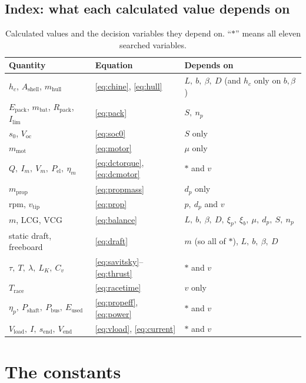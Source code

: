\documentclass[11pt,a4paper]{article}
\renewcommand{\_}{\textunderscore\allowbreak}
\newcommand{\Trace}{T_{\mathrm{race}}}
\newcommand{\Pshaft}{P_{\mathrm{shaft}}}
\newcommand{\Pbus}{P_{\mathrm{bus}}}
\newcommand{\Eused}{E_{\mathrm{used}}}
\newcommand{\Epack}{E_{\mathrm{pack}}}
\newcommand{\Voc}{V_{\mathrm{oc}}}
\newcommand{\Vload}{V_{\mathrm{load}}}
\newcommand{\Vend}{V_{\mathrm{end}}}
\newcommand{\Rpack}{R_{\mathrm{pack}}}
\newcommand{\lcg}{\mathrm{LCG}}
\newcommand{\vcg}{\mathrm{VCG}}
\begin{document}
\subsection{Index: what each calculated value depends on}
\begin{table}[H]
\centering\small
\caption{Calculated values and the decision variables they depend on. ``$\ast$'' means all eleven searched variables.}
\label{tab:index}
\begin{tabularx}{\textwidth}{@{}l l X@{}}
\toprule
Quantity & Equation & Depends on \\
\midrule
$h_c$, $A_{\mathrm{shell}}$, $m_{\mathrm{hull}}$ & \eqref{eq:chine}, \eqref{eq:hull} & $L,\ b,\ \beta,\ D$ (and $h_c$ only on $b,\beta$) \\
$\Epack$, $m_{\mathrm{bat}}$, $\Rpack$, $I_{\lim}$ & \eqref{eq:pack} & $S,\ n_p$ \\
$s_0$, $\Voc$ & \eqref{eq:soc0} & $S$ only \\
$m_{\mathrm{mot}}$ & \eqref{eq:motor} & $\mu$ only \\
$Q,\ I_m,\ V_m,\ P_{\mathrm{el}},\ \eta_m$ & \eqref{eq:dctorque}, \eqref{eq:dcmotor} & $\ast$ and $v$ \\
$m_{\mathrm{prop}}$ & \eqref{eq:propmass} & $d_p$ only \\
rpm, $v_{\mathrm{tip}}$ & \eqref{eq:prop} & $p,\ d_p$ and $v$ \\
$m$, $\lcg$, $\vcg$ & \eqref{eq:balance} & $L,\ b,\ \beta,\ D,\ \xi_p,\ \xi_b,\ \mu,\ d_p,\ S,\ n_p$ \\
static draft, freeboard & \eqref{eq:draft} & $m$ (so all of $\ast$), $L,\ b,\ \beta,\ D$ \\
$\tau,\ T,\ \lambda,\ L_K,\ C_v$ & \eqref{eq:savitsky}--\eqref{eq:thrust} & $\ast$ and $v$ \\
$\Trace$ & \eqref{eq:racetime} & $v$ only \\
$\eta_p,\ \Pshaft,\ \Pbus,\ \Eused$ & \eqref{eq:propeff}, \eqref{eq:power} & $\ast$ and $v$ \\
$\Vload,\ I,\ s_{\mathrm{end}},\ \Vend$ & \eqref{eq:vload}, \eqref{eq:current} & $\ast$ and $v$ \\
\bottomrule
\end{tabularx}
\end{table}


\section{The constants}
\label{sec:fixed}
\end{document}
